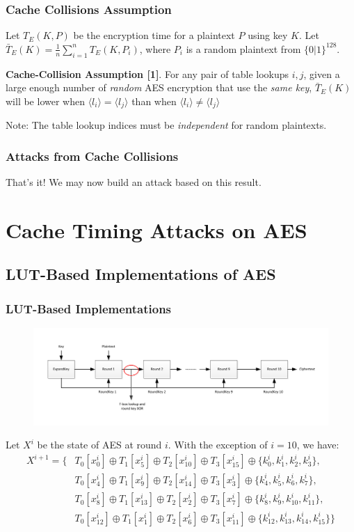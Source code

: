 \documentclass[9pt,handout]{beamer}
\begin{document}
\begin{frame}
	\frametitle{Cache Collisions Assumption}
	Let $T_E(K, P)$ be the encryption time for a plaintext $P$ using key $K$. 
	Let $\bar{T}_E(K) = \frac{1}{n}\sum_{i = 1}^{n}T_E(K, P_i)$, where $P_i$ is a random plaintext from $\{0|1\}^{128}$.

	\bigskip

	\textbf{Cache-Collision Assumption [1]}. For any pair of table lookups $i, j$, given
a large enough number of \emph{random} AES encryption that use the \emph{same key}, $\bar{T}_E(K)$ will
be lower when $\langle l_i \rangle = \langle l_j \rangle$ than when $\langle l_i \rangle \not= \langle l_j \rangle$

	\bigskip
	
	Note: The table lookup indices must be \emph{independent} for random plaintexts.
\end{frame}

\begin{frame}
	\frametitle{Attacks from Cache Collisions}
	\begin{center}
	That's it! We may now build an attack based on this result.
	\end{center}
\end{frame}

\section{Cache Timing Attacks on AES}
\subsection{LUT-Based Implementations of AES}
\begin{frame}
	\frametitle{LUT-Based Implementations}
	\vspace{-4em}
	\begin{figure}[h!]
		\centering
		\includegraphics[scale=0.5]{images/aesRounds.pdf} 
	\end{figure}
	Let $X^i$ be the state of AES at round $i$. With the exception of $i = 10$, we have:
\begin{align*}
X^{i+1} = \{ & T_0[x_0^i] \oplus T_1[x_5^i] \oplus T_2[x_{10}^i] \oplus T_3[x_{15}^i] \oplus \{k_0^i, k_1^i, k_2^i, k_3^i\}, \\
& T_0[x_4^i] \oplus T_1[x_{9}^i] \oplus T_2[x_{14}^i] \oplus T_3[x_3^i] \oplus \{k_4^i, k_5^i, k_6^i, k_7^i\}, \\
& T_0[x_8^i] \oplus T_1[x_{13}^i] \oplus T_2[x_2^i] \oplus T_3[x_7^i] \oplus \{k_8^i, k_9^i, k_{10}^i, k_{11}^i\}, \\
& T_0[x_{12}^i] \oplus T_1[x_1^i] \oplus T_2[x_6^i] \oplus T_3[x_{11}^i] \oplus \{k_{12}^i, k_{13}^i, k_{14}^i, k_{15}^i\}\}
\end{align*}
\end{frame}
\end{document}
